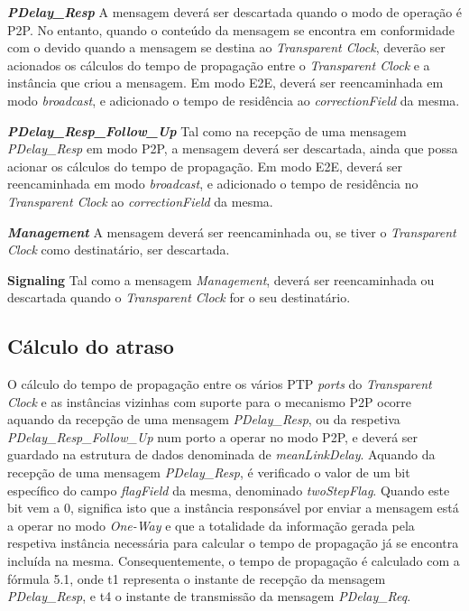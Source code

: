 \textbf{\textit{PDelay\_Resp}} A mensagem deverá ser descartada quando o modo de operação é P2P. No entanto, quando o conteúdo da mensagem se encontra em conformidade com o devido quando a mensagem se destina ao \textit{Transparent Clock}, deverão ser acionados os cálculos do tempo de propagação entre o \textit{Transparent Clock} e a instância que criou a mensagem. Em modo E2E, deverá ser reencaminhada em modo \textit{broadcast}, e adicionado o tempo de residência ao \textit{correctionField} da mesma. 

\textbf{\textit{PDelay\_Resp\_Follow\_Up}} Tal como na recepção de uma mensagem \textit{PDelay\_Resp} em modo P2P, a mensagem deverá ser descartada, ainda que possa acionar os cálculos do tempo de propagação. Em modo E2E, deverá ser reencaminhada em modo \textit{broadcast}, e adicionado o tempo de residência no \textit{Transparent Clock} ao \textit{correctionField} da mesma.

\textbf{\textit{Management}} A mensagem deverá ser reencaminhada ou, se tiver o \textit{Transparent Clock} como destinatário, ser descartada. \par

\textbf{Signaling} Tal como a mensagem \textit{Management}, deverá ser reencaminhada ou descartada quando o \textit{Transparent Clock }for o seu destinatário. \par

\subsection{Cálculo do atraso}

O cálculo do tempo de propagação entre os vários PTP \textit{ports} do \textit{Transparent Clock} e as instâncias vizinhas com suporte para o mecanismo P2P ocorre aquando da recepção de uma mensagem \textit{PDelay\_Resp}, ou da respetiva \textit{PDelay\_Resp\_Follow\_Up} num porto a operar no modo P2P, e deverá ser guardado na estrutura de dados denominada de \textit{meanLinkDelay}. Aquando da recepção de uma mensagem \textit{PDelay\_Resp}, é verificado o valor de um bit específico do campo \textit{flagField} da mesma, denominado \textit{twoStepFlag}. Quando este bit vem a 0, significa isto que a instância responsável por enviar a mensagem está a operar no modo \textit{One-Way} e que a totalidade da informação gerada pela respetiva instância necessária para calcular o tempo de propagação já se encontra incluída na mesma. Consequentemente, o tempo de propagação é calculado com a fórmula 5.1, onde t1 representa o instante de recepção da mensagem \textit{PDelay\_Resp}, e t4 o instante de transmissão da mensagem \textit{PDelay\_Req}.

